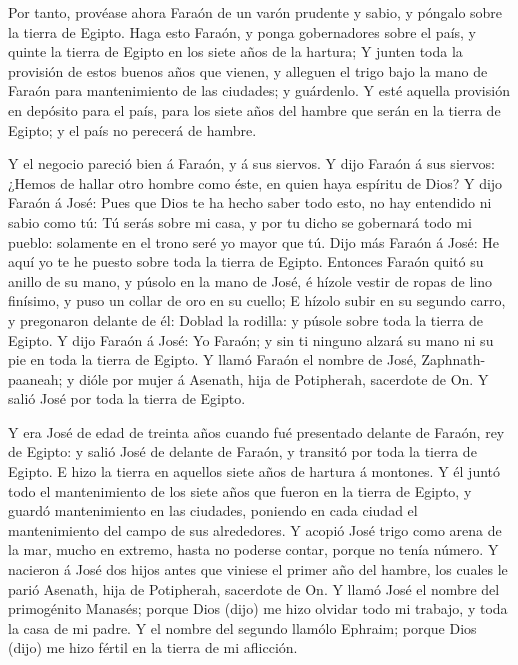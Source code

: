  Por tanto, provéase ahora Faraón de un varón prudente y
sabio, y póngalo sobre la tierra de Egipto.  Haga esto
Faraón, y ponga gobernadores sobre el país, y quinte la tierra de Egipto
en los siete años de la hartura;  Y junten toda la
provisión de estos buenos años que vienen, y alleguen el trigo bajo la
mano de Faraón para mantenimiento de las ciudades; y guárdenlo.
 Y esté aquella provisión en depósito para el país, para
los siete años del hambre que serán en la tierra de Egipto; y el país no
perecerá de hambre.

 Y el negocio pareció bien á Faraón, y á sus siervos.
 Y dijo Faraón á sus siervos: ¿Hemos de hallar otro hombre
como éste, en quien haya espíritu de Dios?  Y dijo Faraón á
José: Pues que Dios te ha hecho saber todo esto, no hay entendido ni
sabio como tú:  Tú serás sobre mi casa, y por tu dicho se
gobernará todo mi pueblo: solamente en el trono seré yo mayor que tú.
 Dijo más Faraón á José: He aquí yo te he puesto sobre toda
la tierra de Egipto.  Entonces Faraón quitó su anillo de su
mano, y púsolo en la mano de José, é hízole vestir de ropas de lino
finísimo, y puso un collar de oro en su cuello;  E hízolo
subir en su segundo carro, y pregonaron delante de él: Doblad la
rodilla: y púsole sobre toda la tierra de Egipto.  Y dijo
Faraón á José: Yo Faraón; y sin ti ninguno alzará su mano ni su pie en
toda la tierra de Egipto.  Y llamó Faraón el nombre de
José, Zaphnath-paaneah; y dióle por mujer á Asenath, hija de Potipherah,
sacerdote de On. Y salió José por toda la tierra de Egipto.

 Y era José de edad de treinta años cuando fué presentado
delante de Faraón, rey de Egipto: y salió José de delante de Faraón, y
transitó por toda la tierra de Egipto.  E hizo la tierra en
aquellos siete años de hartura á montones.  Y él juntó todo
el mantenimiento de los siete años que fueron en la tierra de Egipto, y
guardó mantenimiento en las ciudades, poniendo en cada ciudad el
mantenimiento del campo de sus alrededores.  Y acopió José
trigo como arena de la mar, mucho en extremo, hasta no poderse contar,
porque no tenía número.  Y nacieron á José dos hijos antes
que viniese el primer año del hambre, los cuales le parió Asenath, hija
de Potipherah, sacerdote de On.  Y llamó José el nombre del
primogénito Manasés; porque Dios (dijo) me hizo olvidar todo mi trabajo,
y toda la casa de mi padre.  Y el nombre del segundo
llamólo Ephraim; porque Dios (dijo) me hizo fértil en la tierra de mi
aflicción.

